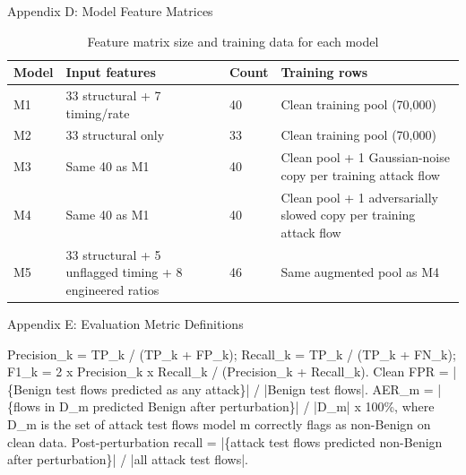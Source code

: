 \documentclass[12pt,a4paper]{report}
\begin{document}
\begin{center}Appendix D: Model Feature Matrices\end{center}
\begin{table}[h]\centering
\caption{Feature matrix size and training data for each model}
\begin{tabularx}{\linewidth}{XXXX}
\toprule
\textbf{Model} & \textbf{Input features} & \textbf{Count} & \textbf{Training rows} \\
\midrule
M1 & 33 structural + 7 timing/rate & 40 & Clean training pool (70,000) \\
M2 & 33 structural only & 33 & Clean training pool (70,000) \\
M3 & Same 40 as M1 & 40 & Clean pool + 1 Gaussian-noise copy per training attack flow \\
M4 & Same 40 as M1 & 40 & Clean pool + 1 adversarially slowed copy per training attack flow \\
M5 & 33 structural + 5 unflagged timing + 8 engineered ratios & 46 & Same augmented pool as M4 \\
\bottomrule
\end{tabularx}
\end{table}
\begin{center}Appendix E: Evaluation Metric Definitions\end{center}
Precision\_k = TP\_k / (TP\_k + FP\_k); Recall\_k = TP\_k / (TP\_k + FN\_k); F1\_k = 2 x Precision\_k x Recall\_k / (Precision\_k + Recall\_k). Clean FPR = |\{Benign test flows predicted as any attack\}| / |Benign test flows|. AER\_m = |\{flows in D\_m predicted Benign after perturbation\}| / |D\_m| x 100\%, where D\_m is the set of attack test flows model m correctly flags as non-Benign on clean data. Post-perturbation recall = |\{attack test flows predicted non-Benign after perturbation\}| / |all attack test flows|.
\end{document}
